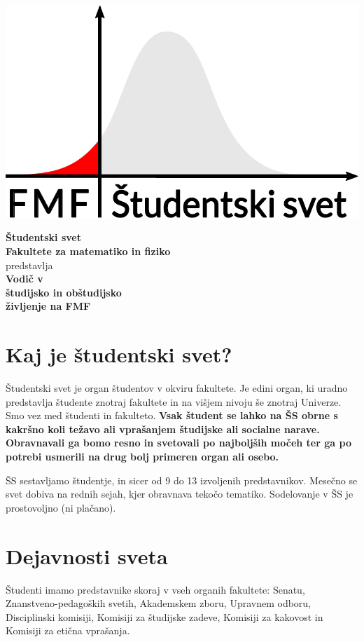 \documentclass[a4paper,notumble]{leaflet} %
\begin{document}
  \begin{center}
    \includegraphics[width=0.6\linewidth]{ssfmf_logo_col.pdf}

    \vfill

    \textbf{\Huge Študentski svet} \\[0.2cm]
    \textbf{Fakultete za matematiko in fiziko} \\ [1cm]

     predstavlja \\[1cm]

    \textbf{\LARGE Vodič v \\[0.2ex] študijsko in obštudijsko \\[1ex]  življenje na FMF}

    \vfill
    \vfill
    \vfill


  \end{center}
  \newpage
  \section{Kaj je študentski svet?}
  Študentski svet je organ študentov v okviru fakultete. Je edini organ, ki uradno predstavlja študente znotraj fakultete in na višjem nivoju še znotraj Univerze. Smo vez med študenti in fakulteto. \textbf{Vsak študent se lahko na ŠS obrne s kakršno koli težavo ali vprašanjem študijske ali socialne narave. Obravnavali ga bomo resno in svetovali po najboljših močeh ter ga po potrebi usmerili na drug bolj primeren organ ali osebo.}

  ŠS sestavljamo študentje, in sicer od 9 do 13 izvoljenih predstavnikov.
  Mesečno se svet dobiva na rednih sejah, kjer obravnava tekočo tematiko. Sodelovanje v ŠS je prostovoljno (ni plačano).

  \section{Dejavnosti sveta}
  Študenti imamo predstavnike skoraj v vseh organih fakultete:
  Senatu, Znanstveno-pedagoških svetih, Akademskem zboru,
  Upravnem odboru, Disciplinski komisiji, Komisiji za študijske zadeve, Komisiji za kakovost in Komisiji za etična vprašanja.
\end{document}
